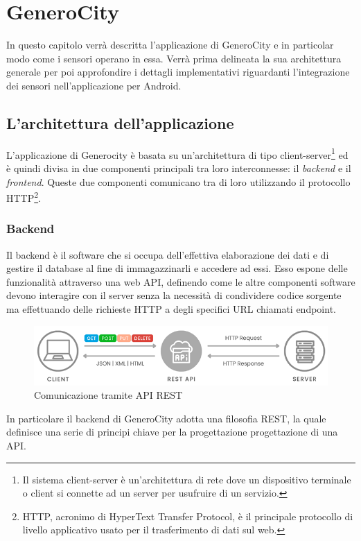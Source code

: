 \chapter{GeneroCity}

In questo capitolo verrà descritta l'applicazione di GeneroCity e in particolar modo come i sensori operano in essa. Verrà prima delineata la sua architettura generale per poi approfondire i dettagli implementativi riguardanti l'integrazione dei sensori nell'applicazione per Android. 

\section{L'architettura dell'applicazione}
L'applicazione di Generocity è basata su un'architettura di tipo client-server\footnote{Il sistema client-server è un'architettura di rete dove un dispositivo terminale o client si connette ad un server per usufruire di un servizio.} ed è quindi divisa in due componenti principali tra loro interconnesse: il \textit{backend} e il \textit{frontend}. Queste due componenti comunicano tra di loro utilizzando il protocollo HTTP\footnote{HTTP, acronimo di HyperText Transfer Protocol, è il principale protocollo di livello applicativo usato per il trasferimento di dati sul web.}.

\subsection{Backend}
Il backend è il software che si occupa dell'effettiva elaborazione dei dati e di gestire il database al fine di immagazzinarli e accedere ad essi. Esso espone delle funzionalità attraverso una web API, definendo come le altre componenti software devono interagire con il server senza la necessità di condividere codice sorgente ma effettuando delle richieste HTTP a degli specifici URL chiamati endpoint.
\begin{figure}[h]
    \centering
    \includegraphics[width=1\linewidth]{images/rest.png}
    \caption{Comunicazione tramite API REST}
    \label{fig:rest}
\end{figure}
In particolare il backend di GeneroCity adotta una filosofia REST, la quale definisce una serie di principi chiave per la progettazione progettazione di una API.


